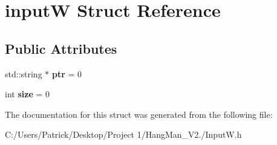 \hypertarget{structinput_w}{}\section{inputW Struct Reference}
\label{structinput_w}
\subsection*{Public Attributes}
\begin{DoxyCompactItemize}
\item 
\mbox{\label{structinput_w_a4f5d7a2b1a4ec7cb5a16738f79fa0be0}} 
std\+::string $\ast$ {\bfseries ptr} = 0
\item 
\mbox{\label{structinput_w_a9739d14a3bb3c17292cc7b5a1b21b4ba}} 
int {\bfseries size} = 0
\end{DoxyCompactItemize}


The documentation for this struct was generated from the following file\+:\begin{DoxyCompactItemize}
\item 
C\+:/\+Users/\+Patrick/\+Desktop/\+Project 1/\+Hang\+Man\+\_\+\+V2./Input\+W.\+h\end{DoxyCompactItemize}
